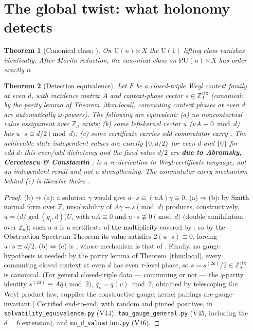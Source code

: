 \documentclass[11pt]{article}
\newtheorem{theorem}{Theorem}
\theoremstyle{definition}
\theoremstyle{remark}
\newcommand{\U}{\mathrm{U}}
\newcommand{\PU}{\mathrm{PU}}
\begin{document}
\section{The global twist: what holonomy detects}\label{sec:global}
\begin{theorem}[Canonical class; \cite{paperA}]\label{thm:class}
On $\U(n)\ltimes X$ the $\U(1)$ lifting class vanishes identically. After Morita
reduction, the canonical class on $\PU(n)\ltimes X$ has order exactly $n$.
\end{theorem}

\begin{theorem}[Detection equivalence]\label{thm:avn}
Let $F$ be a closed-triple Weyl context family at even $d$, with incidence matrix $A$
and context-phase vector $s\in\mathbb Z_d^{\mathrm{ctx}}$ (canonical: by the parity
lemma of Theorem~\ref{thm:local}, commuting context phases at even $d$ are
automatically $\omega$-powers). The following
are equivalent: (a) no noncontextual value assignment over $\mathbb Z_d$ exists; (b)
some left-kernel vector $u$ ($uA\equiv 0 \bmod d$) has $u\cdot s\equiv d/2 \pmod d$;
(c) some certificate carries odd commutator carry \cite[Thm.~4]{paperB}. The achievable
state-independent values are exactly $\{0,d/2\}$ for even $d$ and $\{0\}$ for odd $d$:
this even/odd dichotomy and the fixed value $d/2$ are \textbf{due to Abramsky, Cercelescu
\& Constantin} \cite[Thm.~16]{ACC}; \cite[Thm.~1]{paperB} is a re-derivation in
Weyl-certificate language, not an independent result and not a strengthening. The
commutator-carry mechanism behind (c) is likewise theirs \cite[Lem.~15, Thm.~16]{ACC}.
\end{theorem}
\begin{proof}
(b)$\Rightarrow$(a): a solution $\gamma$ would give $u\cdot s\equiv (uA)\gamma\equiv
0$. (a)$\Rightarrow$(b): by Smith normal form over $\mathbb Z$, unsolvability of
$A\gamma\equiv s \pmod d$ produces, constructively, $u=\bigl(d/\gcd(g_i,d)\bigr)U_i$ with $uA\equiv 0$
and $u\cdot s\not\equiv 0 \pmod d$ (double annihilation over $\mathbb Z_d$); such a
$u$ is a certificate of the multiplicity covered by \cite[Rem.~3]{paperB}, so by the
Obstruction Spectrum Theorem \cite[Thm.~1]{paperB} its value satisfies $2(u\cdot
s)\equiv 0$, forcing $u\cdot s\equiv d/2$. (b)$\Leftrightarrow$(c) is
\cite[Thm.~4]{paperB}, whose mechanism is that of \cite[Lem.~15]{ACC}. Finally, no gauge hypothesis is needed: by the parity lemma of
Theorem~\ref{thm:local}, every commuting closed context at even $d$ has even
$\tau$-level phase, so $s=s^{(2d)}/2\in\mathbb Z_d^{\mathrm{ctx}}$ is canonical. (For
general closed-triple data --- commuting or not --- the $q$-parity identity
$s^{(2d)}\equiv A\bar q \pmod 2$, $\bar q_v=q(v)\bmod 2$, obtained by telescoping the
Weyl product law, supplies the constructive gauge; kernel pairings are
gauge-invariant.) Certified end-to-end, with random and pinned positives, in
\texttt{solvability\_equivalence.py} (V44),
\texttt{tau\_gauge\_general.py} (V45, including the $d=6$ extension), and
\texttt{mu\_d\_valuation.py} (V46).
\end{proof}
\end{document}
